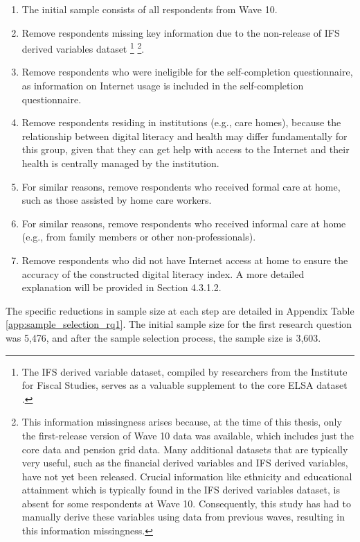 \begin{enumerate}
    \item The initial sample consists of all respondents from Wave 10.
    \item Remove respondents missing key information due to the non-release of IFS derived variables dataset \footnote{The IFS derived variable dataset, compiled by researchers from the Institute for Fiscal Studies, serves as a valuable supplement to the core ELSA dataset \parencite{ifs_english_2022}.} \footnote{This information missingness arises because, at the time of this thesis, only the first-release version of Wave 10 data was available, which includes just the core data and pension grid data. Many additional datasets that are typically very useful, such as the financial derived variables and IFS derived variables, have not yet been released. Crucial information like ethnicity and educational attainment which is typically found in the IFS derived variables dataset, is absent for some respondents at Wave 10. Consequently, this study has had to manually derive these variables using data from previous waves, resulting in this information missingness.}.
    \item Remove respondents who were ineligible for the self-completion questionnaire, as information on Internet usage is included in the self-completion questionnaire.
    \item Remove respondents residing in institutions (e.g., care homes), because the relationship between digital literacy and health may differ fundamentally for this group, given that they can get help with access to the Internet and their health is centrally managed by the institution.
    \item For similar reasons, remove respondents who received formal care at home, such as those assisted by home care workers.
    \item For similar reasons, remove respondents who received informal care at home (e.g., from family members or other non-professionals).
    \item Remove respondents who did not have Internet access at home to ensure the accuracy of the constructed digital literacy index. A more detailed explanation will be provided in Section 4.3.1.2.
\end{enumerate}

The specific reductions in sample size at each step are detailed in Appendix Table \ref{app:sample_selection_rq1}. The initial sample size for the first research question was 5,476, and after the sample selection process, the sample size is 3,603.


